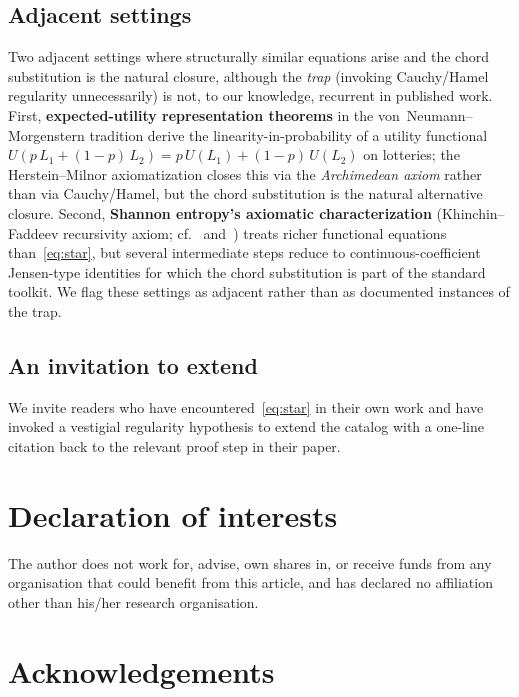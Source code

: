 \documentclass[11pt,a4paper]{amsart}
\begin{document}
\subsection{Adjacent settings}
\label{ssec:adjacent}

Two adjacent settings where structurally similar equations arise and the
chord substitution is the natural closure, although the \emph{trap}
(invoking Cauchy/Hamel regularity unnecessarily) is not, to our knowledge,
recurrent in published work. First, \textbf{expected-utility representation
theorems} in the von~Neumann--Morgenstern tradition derive the
linearity-in-probability of a utility functional
$U(p\,L_1+(1-p)\,L_2)=p\,U(L_1)+(1-p)\,U(L_2)$ on lotteries; the
Herstein--Milnor axiomatization closes this via the \emph{Archimedean
axiom} rather than via Cauchy/Hamel, but the chord substitution is the
natural alternative closure. Second, \textbf{Shannon entropy's axiomatic
characterization} (Khinchin--Faddeev recursivity axiom; cf.~\cite{Aczel1966}
and~\cite{AczelDhombres1989}) treats richer functional equations
than~\eqref{eq:star}, but several intermediate steps reduce to
continuous-coefficient Jensen-type identities for which the chord
substitution is part of the standard toolkit. We flag these settings as
adjacent rather than as documented instances of the trap.

\subsection{An invitation to extend}
\label{ssec:invitation}

We invite readers who have encountered~\eqref{eq:star} in their own work
and have invoked a vestigial regularity hypothesis to extend the catalog
with a one-line citation back to the relevant proof step in their paper.

\section*{Declaration of interests}

The author does not work for, advise, own shares in, or receive funds from
any organisation that could benefit from this article, and has declared no
affiliation other than his/her research organisation.

\section*{Acknowledgements}
\end{document}
